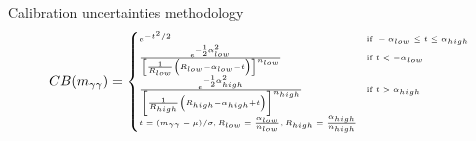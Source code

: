 \begin{frame}{Calibration uncertainties methodology}
    \begin{equation}
      \tiny
      CB(m_{\gamma \gamma}) = 
      \begin{cases}
        e^{-t^{2}/2} & \text{if } -\alpha_{low} \leq t \leq \alpha_{high} \\
        \frac{ e^{-{}^{1}_{2} \alpha_{low}^{2}} } { \left[ \frac{1}{R_{low}} \left(R_{low} - \alpha_{low} - t \right) \right]^{n_{low}} } & \text{if } t < -\alpha_{low} \\
        \frac{ e^{-{}^{1}_{2} \alpha_{high}^{2}} } { \left[ \frac{1}{R_{high}} \left(R_{high} - \alpha_{high} + t \right) \right]^{n_{high}} } & \text{if } t > \alpha_{high} \\
        t=(m_{\gamma\gamma}-\mu)/\sigma, R_{low}=\frac{\alpha_{low}}{n_{low}},  R_{high}=\frac{\alpha_{high}}{n_{high}} \\
      \end{cases}
    \end{equation}

\end{frame}




